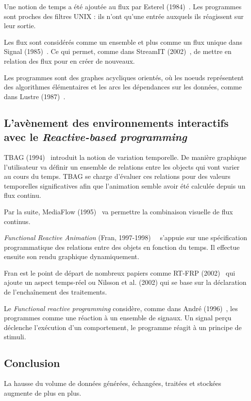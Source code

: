 \documentclass{llncs}
\newcommand{\RP}{\emph{Reactive-based programming} }
\newcommand{\FRP}{\emph{Functional reactive programming} }
\begin{document}
Une notion de temps a été ajoutée au flux par Esterel (1984)~\cite{Berry84}.
Les programmes sont proches des filtres UNIX : ils n'ont qu'une entrée auxquels
ils réagissent sur leur sortie.

Les flux sont considérés comme un ensemble et plus comme un flux unique dans Signal (1985)~\cite{Benveniste85}.
Ce qui permet, comme dans StreamIT (2002)~\cite{Thies02}, de mettre en relation des flux
pour en créer de nouveaux.

Les programmes sont des graphes acycliques orientés, où les noeuds représentent des
algorithmes élémentaires et les arcs les dépendances sur les données, comme dans
Lustre (1987)~\cite{Caspi87}.

\subsection{L'avènement des environnements interactifs avec le \RP}
TBAG (1994)~\cite{Elliott94} introduit la notion de variation temporelle.
De manière graphique l'utilisateur va définir un ensemble de relations
entre les objects qui vont varier au cours du temps.
TBAG se charge d'évaluer ces relations pour des valeurs temporelles
significatives afin que l'animation semble avoir été calculée depuis
un flux continu.

Par la suite, MediaFlow (1995)~\cite{Elliott95} va permettre la combinaison visuelle
de flux continus.

\emph{Functional Reactive Animation} (Fran, 1997-1998)~\cite{Elliott97}~\cite{Elliott98}
s'appuie sur une spécification programmatique des relations entre des objets
en fonction du temps.
Il effectue ensuite son rendu graphique dynamiquement.

Fran est le point de départ de nombreux papiers comme RT-FRP (2002)~\cite{Wan02}
qui ajoute un aspect temps-réel ou Nilsson et al. (2002)\cite{Nilsson2002a} qui se base
sur la déclaration de l'enchaînement des traitements.

Le \FRP considère, comme dans André (1996)~\cite{Andre96}, les programmes comme
une réaction à un ensemble de signaux. Un signal perçu déclenche l'exécution
d'un comportement, le programme réagit à un principe de stimuli.

\subsection{Conclusion}
La hausse du volume de données générées, échangées, traitées et stockées augmente de
plus en plus.
\end{document}

